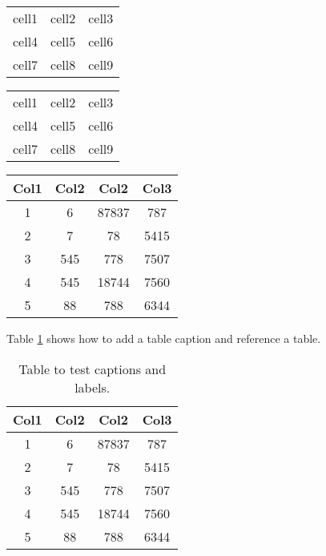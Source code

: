 \documentclass{article}
\begin{document}
\begin{center}
  \begin{tabular}{c c c}
    cell1 & cell2 & cell3 \\
    cell4 & cell5 & cell6 \\
    cell7 & cell8 & cell9
  \end{tabular}
\end{center}

\begin{center}
  \begin{tabular}{|c|c|c|}
    \hline
    cell1 & cell2 & cell3 \\
    cell4 & cell5 & cell6 \\
    cell7 & cell8 & cell9 \\
    \hline
  \end{tabular}
\end{center}

\begin{center}
  \begin{tabular}{||c c c c||}
    \hline
    Col1 & Col2 & Col2 & Col3 \\ [0.5ex]
    \hline\hline
    1 & 6 & 87837 & 787 \\
    \hline
    2 & 7 & 78 & 5415 \\
    \hline
    3 & 545 & 778 & 7507 \\
    \hline
    4 & 545 & 18744 & 7560 \\
    \hline
    5 & 88 & 788 & 6344 \\ [1ex]
    \hline
  \end{tabular}
\end{center}

Table \ref{table:data} shows how to add a table caption and reference a table.
\begin{table}[h!]
  \centering
  \begin{tabular}{||c c c c||}
    \hline
    Col1 & Col2 & Col2 & Col3 \\ [0.5ex]
    \hline\hline
    1 & 6 & 87837 & 787 \\
    2 & 7 & 78 & 5415 \\
    3 & 545 & 778 & 7507 \\
    4 & 545 & 18744 & 7560 \\
    5 & 88 & 788 & 6344 \\ [1ex]
    \hline
  \end{tabular}
  \caption{Table to test captions and labels.}
  \label{table:data}
\end{table}
\end{document}

